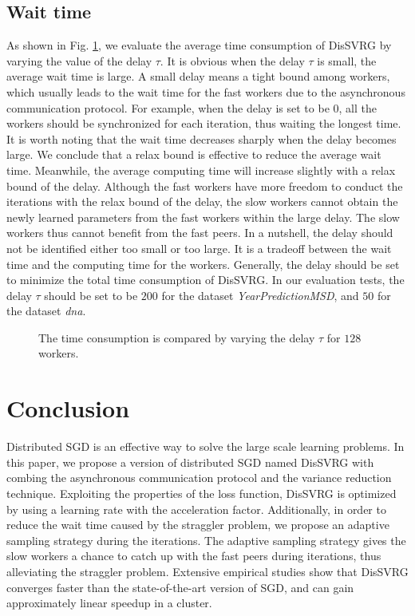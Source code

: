 \documentclass[preprint,review,11pt,a4paper]{elsarticle}
\begin{document}
\subsection{Wait time}
As shown in Fig. \ref{figure_evaluation3_delay}, we evaluate the average time consumption of DisSVRG by varying the value of the delay $\tau$. It is obvious when the delay $\tau$ is small, the average wait time is large. A small delay means a tight bound among workers, which usually leads to the wait time for the fast workers due to the asynchronous communication protocol. For example, when the delay is set to be $0$, all the workers should be synchronized for each iteration, thus waiting the longest time. It is worth noting that the wait time decreases sharply when the delay becomes large. We conclude that a relax bound is effective to reduce the average wait time. Meanwhile, the average computing time will increase slightly with a relax bound of the delay. Although the fast workers have more freedom to conduct the iterations with the relax bound of the delay, the slow workers cannot obtain the newly learned parameters from the fast workers within the large delay. The slow workers thus cannot  benefit from the fast peers. In a nutshell, the delay should not be identified either too small or too large. It is a tradeoff between the wait time and the computing time for the workers. Generally, the delay should be set to minimize the total time consumption of DisSVRG. In our evaluation tests, the delay $\tau$ should be set to be  $200$ for the dataset \emph{YearPredictionMSD}, and $50$ for the dataset \emph{dna}.

\begin{figure}
\centering
{}
\caption{The time consumption is compared by varying the delay $\tau$ for $128$ workers.}
\label{figure_evaluation3_delay}
\end{figure}

\section{Conclusion}
\label{conclusion}
Distributed SGD is an effective way to solve the large scale learning problems. In this paper, we propose a version of distributed SGD named DisSVRG with combing the asynchronous communication protocol and the variance reduction technique. Exploiting the properties of the loss function, DisSVRG is optimized by using a learning rate with the acceleration factor. Additionally, in order to reduce the wait time caused by the straggler problem, we propose an adaptive sampling strategy during the iterations. The adaptive sampling strategy gives the slow workers a chance to catch up with the fast peers during iterations, thus alleviating the straggler problem. Extensive empirical studies show that DisSVRG converges faster than the state-of-the-art version of SGD, and can gain approximately linear speedup in a cluster.
\end{document}
